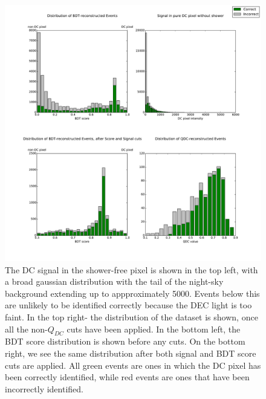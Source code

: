 \documentclass[11pt]{article}
\begin{document}
\begin{figure}
\begin{center}
\includegraphics[width=\textwidth]{hess1statsbigtestdata}
\caption{The DC signal in the shower-free pixel is shown in the top left, with a broad gaussian distribution with the tail of the night-sky background extending up to appproximately 5000. Events below this are unlikely to be identified correctly because the DEC light is too faint. In the top right- the distribution of the dataset is shown, once all the non-$Q_{DC}$ cuts have been applied. In the bottom left, the BDT score distribution is shown before any cuts. On the bottom right, we see the same distribution after both signal and BDT score cuts are applied. All green events are ones in which the DC pixel has been correctly identified, while red events are ones that have been incorrectly identified.}
\label{fig:cutdistribution}
\end{center}
\end{figure}
\end{document}
